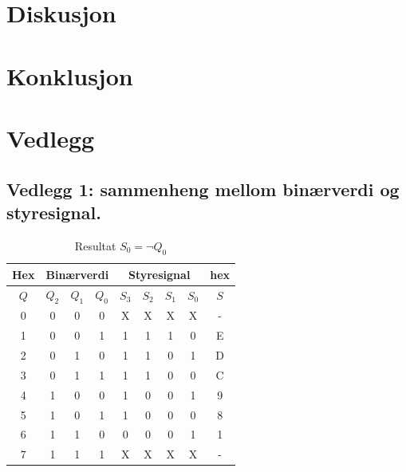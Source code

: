 \documentclass[12pt,norsk,a4paper]{article}
\begin{document}
\clearpage

\section{Diskusjon}
\clearpage

\section{Konklusjon}
\clearpage

\section{Vedlegg}
    \subsection{Vedlegg 1: sammenheng mellom binærverdi og styresignal.}
    \begin{table}[H]
    \begin{center}
    \begin{tabular}{|c|c|c|c|c|c|c|c|c|}
    \hline
    Hex & \multicolumn{3}{|c|}{Binærverdi} & \multicolumn{4}{|c|}{Styresignal}&hex \\ \hline
    $Q$ & $Q_2$ & $Q_1$ & $Q_0$ & $S_3$ & $S_2$ & $S_1$ & $S_0$ & $S$ \\ \hline
    0 & 0 & 0 & 0 & X & X & X & X & - \\ \hline 
    1 & 0 & 0 & 1 & 1 & 1 & 1 & 0 & E \\ \hline
    2 & 0 & 1 & 0 & 1 & 1 & 0 & 1 & D \\ \hline
    3 & 0 & 1 & 1 & 1 & 1 & 0 & 0 & C \\ \hline
    4 & 1 & 0 & 0 & 1 & 0 & 0 & 1 & 9 \\ \hline
    5 & 1 & 0 & 1 & 1 & 0 & 0 & 0 & 8 \\ \hline
    6 & 1 & 1 & 0 & 0 & 0 & 0 & 1 & 1 \\ \hline
    7 & 1 & 1 & 1 & X & X & X & X & - \\ \hline
    \end{tabular}
    \end{center}
    \caption{Resultat $S_0=\neg Q_0$}
    \end{table}
    \clearpage
\end{document}
